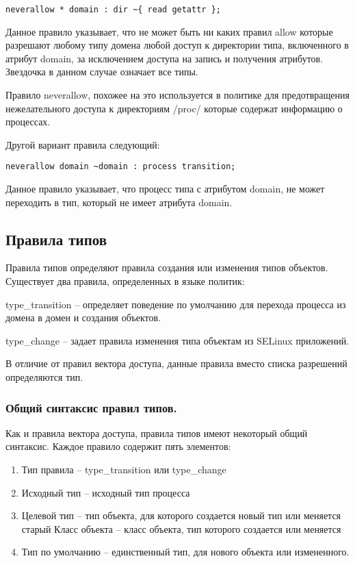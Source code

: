 \documentclass{./../class/UIR}
\begin{document}
\begin{verbatim}
neverallow * domain : dir ~{ read getattr };
\end{verbatim}

Данное правило указывает, что не может быть ни каких правил allow которые
разрешают любому типу домена любой доступ к директории типа, включенного в
атрибут domain, за исключением доступа на запись и получения атрибутов.
Звездочка в данном случае означает все типы.

Правило neverallow, похожее на это используется в политике для предотвращения
нежелательного доступа к директориям /proc/ которые содержат информацию о
процессах.

Другой вариант правила следующий:

\begin{verbatim}
neverallow domain ~domain : process transition;
\end{verbatim}

Данное правило указывает, что процесс типа с атрибутом domain, не может
переходить в тип, который не имеет атрибута domain.

\subsection{Правила типов}

Правила типов определяют  правила создания или изменения типов объектов.
Существует два правила, определенных в языке политик:

\begin{description}
\item type\_transition – определяет поведение по умолчанию для перехода процесса
из домена в домен и создания объектов.
\item type\_change – задает правила изменения типа объектам из SELinux
приложений.
\end{description}

В отличие от правил вектора доступа, данные правила вместо списка разрешений
определяются тип.

\subsubsection{Общий синтаксис правил типов.}

Как и правила вектора доступа, правила типов имеют некоторый общий синтаксис. Каждое правило содержит пять элементов:
\begin{enumerate}
\item Тип правила – type\_transition или type\_change
\item Исходный тип – исходный тип процесса
\item Целевой тип – тип объекта, для которого создается новый тип или меняется
старый Класс объекта – класс объекта, тип которого создается или меняется
\item Тип по умолчанию – единственный тип, для нового объекта или измененного.
\end{enumerate}
\end{document}
